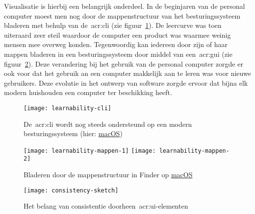 Visualisatie is hierbij een belangrijk onderdeel. In de beginjaren van de personal computer moest men nog door de mappenstructuur van het besturingssysteem bladeren met behulp van de~\acrlong{acr:cli} (zie figuur~\ref{fig:learnability:cli}). De leercurve was toen uiteraard zeer steil waardoor de computer een product was waarmee weinig mensen mee overweg konden. Tegenwoordig kan iedereen door zijn of haar mappen bladeren in een besturingssysteem door middel van een~\acrlong{acr:gui} (zie figuur~\ref{fig:learnability:mappen}). Deze verandering bij het gebruik van de personal computer zorgde er ook voor dat het gebruik an een computer makkelijk aan te leren was voor nieuwe gebruikers. Deze evolutie in het ontwerp van software zorgde ervoor dat bijna elk modern huishouden een computer ter beschikking heeft.

\begin{figure}
    \centering
    \texttt{[image: learnability-cli]}
    \caption[Mappenstructuur met~\acrlong{acr:cli}]{De~\acrlong{acr:cli} wordt nog steeds ondersteund op een modern besturingssysteem (hier: \href{https://www.apple.com/macos/}{macOS})}
    \label{fig:learnability:cli}
\end{figure}
\begin{figure}
    \centering
    \texttt{[image: learnability-mappen-1]}
    \texttt{[image: learnability-mappen-2]}
    \caption[Mappenstructuur met~\acrlong{acr:gui}]{Bladeren door de mappenstructuur in Finder op \href{https://www.apple.com/macos/}{macOS}}
    \label{fig:learnability:mappen}
\end{figure}

\begin{figure}[h]
    \centering
    \texttt{[image: consistency-sketch]}
    \caption[Consistentie doorheen~\acrshort{acr:ui}-elementen]{Het belang van consistentie doorheen~\acrshort{acr:ui}-elementen}
    \label{fig:learnability:consistentie}
\end{figure}

